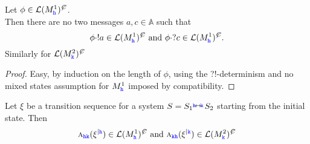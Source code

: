 \begin{lemma}
\label{lem:notwomarks}
Let $\phi\in\lang{M^1_\HH}^\mC$.\\
Then there are no two messages $a,c\in \mathbb{A}$ such that \\
$$\phi\cdot !a\in\lang{M^1_\HH}^\mC \mathrm{~and~}  \phi\cdot ?c\in\lang{M^1_\HH}^\mC.$$
Similarly for $\lang{M^2_\KK}^\mC$
\end{lemma}
\begin{proof}
Easy, by induction on the length of $\phi$, 
using the
?!-determinism and no mixed states assumption for
$M^1_\HH$ imposed by compatibility.

\end{proof}

\begin{lemma}
\label{lem:inlangs}
Let $\xi$ be a transition sequence for a system
$S={S_{1}}\connect{\HH}{\KK} {S_{2}}$ starting from the initial state. Then
$$\symb{\HH\KK}{\restrictup{\xi}{\HH}}\in\lang{M^1_\HH}^\mC \text{ and }
\symb{\KK\HH}{\restrictup{\xi}{\KK}}\in\lang{M^2_\KK}^\mC$$
\end{lemma}
